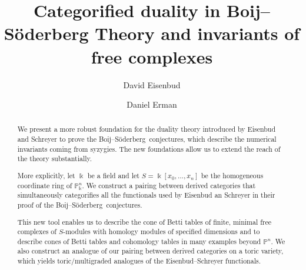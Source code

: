 \documentclass[12pt]{amsart}
\title{Categorified duality in Boij--S\"oderberg Theory and invariants of free complexes}
\author{David Eisenbud}
\author{Daniel Erman}\thanks{The first author was partially supported by an NSF grant, and the second author was partially supported by an NSF fellowship and by a Simons Foundation fellowship.}
\theoremstyle{definition}
\theoremstyle{remark}
\newcommand{\kk}{\Bbbk}
\newcommand{\PP}{\mathbb{P}}
\def\BS{Boij--S\"oderberg~}
\begin{document}
\begin{abstract} We present a more robust foundation for the duality theory introduced by Eisenbud and Schreyer to prove the \BS conjectures, which describe the numerical invariants coming from syzygies.
The new foundations allow us to extend the reach of the theory substantially.

More explicitly, let $\kk$ be a field and let $S = \kk[x_{0}, \dots,x_{n}]$ be the homogeneous coordinate ring of $\PP^{n}_{\kk}$.
We construct a pairing between derived categories that
simultaneously categorifies all the functionals used by Eisenbud an Schreyer in their proof of the \BS conjectures.

This new tool enables us to describe the cone of Betti tables of finite, minimal free complexes of $S$-modules with homology modules of specified dimensions and  to describe cones of Betti tables and cohomology tables in many examples beyond $\PP^n$. We also construct an analogue of our pairing between derived categories on a toric variety, which yields toric/multigraded analogues of the Eisenbud--Schreyer functionals.
\end{abstract}

\maketitle

\tableofcontents


\end{document}
